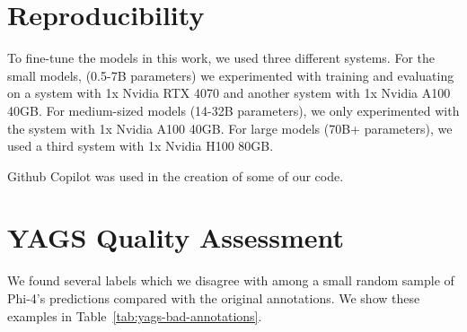 % 

\section{Reproducibility}
\label{app:reproducibility}
To fine-tune the models in this work, we used three different systems. For the small models, (0.5-7B parameters) we experimented with training and evaluating on a system with 1x Nvidia RTX 4070 and another system with 1x Nvidia A100 40GB. For medium-sized models (14-32B parameters), we only experimented with the system with 1x Nvidia A100 40GB. For large models (70B+ parameters), we used a third system with 1x Nvidia H100 80GB. 

Github Copilot was used in the creation of some of our code.

\section{YAGS Quality Assessment}
\label{app:yags-bad}

We found several labels which we disagree with among a small random sample of Phi-4's predictions compared with the original annotations. We show these examples in Table~\ref{tab:yags-bad-annotations}.

